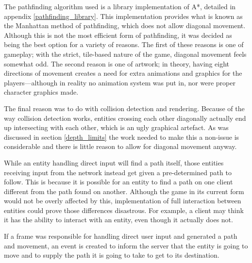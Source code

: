 The pathfinding algorithm used is a library implementation of A*, detailed in appendix \ref{pathfinding_library}. This implementation provides what is known as the Manhattan method of pathfinding, which does not allow diagonal movement. Although this is not the most efficient form of pathfinding, it was decided as being the best option for a variety of reasons. The first of these reasons is one of gameplay; with the strict, tile-based nature of the game, diagonal movement feels somewhat odd. The second reason is one of artwork; in theory, having eight directions of movement creates a need for extra animations and graphics for the players---although in reality no animation system was put in, nor were proper character graphics made.


The final reason was to do with collision detection and rendering. Because of the way collision detection works, entities crossing each other diagonally actually end up intersecting with each other, which is an ugly graphical artefact. As was discussed in section \ref{depth_limits} the work needed to make this a non-issue is considerable and there is little reason to allow for diagonal movement anyway.


While an entity handling direct input will find a path itself, those entities receiving input from the network instead get given a pre-determined path to follow. This is because it is possible for an entity to find a path on one client different from the path found on another. Although the game in its current form would not be overly affected by this, implementation of full interaction between entities could prove those differences disastrous. For example, a client may think it has the ability to interact with an entity, even though it actually does not.


If a frame was responsible for handling direct user input and generated a path and movement, an event is created to inform the server that the entity is going to move and to supply the path it is going to take to get to its destination.

